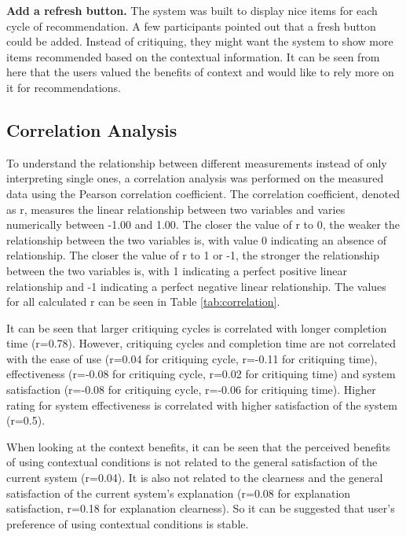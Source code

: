 \textbf{Add a refresh button.} The system was built to display nice items for each cycle of recommendation. A few participants pointed out that a fresh button could be added. Instead of critiquing, they might want the system to show more items recommended based on the contextual information. It can be seen from here that the users valued the benefits of context and would like to rely more on it for recommendations.

\subsection{Correlation Analysis} \label{sec:results_ca}

To understand the relationship between different measurements instead of only interpreting single ones, a correlation analysis was performed on the measured data using the Pearson correlation coefficient. The correlation coefficient, denoted as r, measures the linear relationship between two variables and varies numerically between -1.00 and 1.00. The closer the value of r to 0, the weaker the relationship between the two variables is, with value 0 indicating an absence of relationship. The closer the value of r to 1 or -1, the stronger the relationship between the two variables is, with 1 indicating a perfect positive linear relationship and -1 indicating a perfect negative linear relationship. The values for all calculated r can be seen in Table \ref{tab:correlation}.

It can be seen that larger critiquing cycles is correlated with longer completion time (r=0.78). However, critiquing cycles and completion time are not correlated with the ease of use (r=0.04 for critiquing cycle, r=-0.11 for critiquing time), effectiveness (r=-0.08 for critiquing cycle, r=0.02 for critiquing time) and system satisfaction (r=-0.08 for critiquing cycle, r=-0.06 for critiquing time). Higher rating for system effectiveness is correlated with higher satisfaction of the system (r=0.5). 

When looking at the context benefits, it can be seen that the perceived benefits of using contextual conditions is not related to the general satisfaction of the current system (r=0.04). It is also not related to the clearness and the general satisfaction of the current system's explanation (r=0.08 for explanation satisfaction, r=0.18 for explanation clearness). So it can be suggested that user's preference of using contextual conditions is stable.

